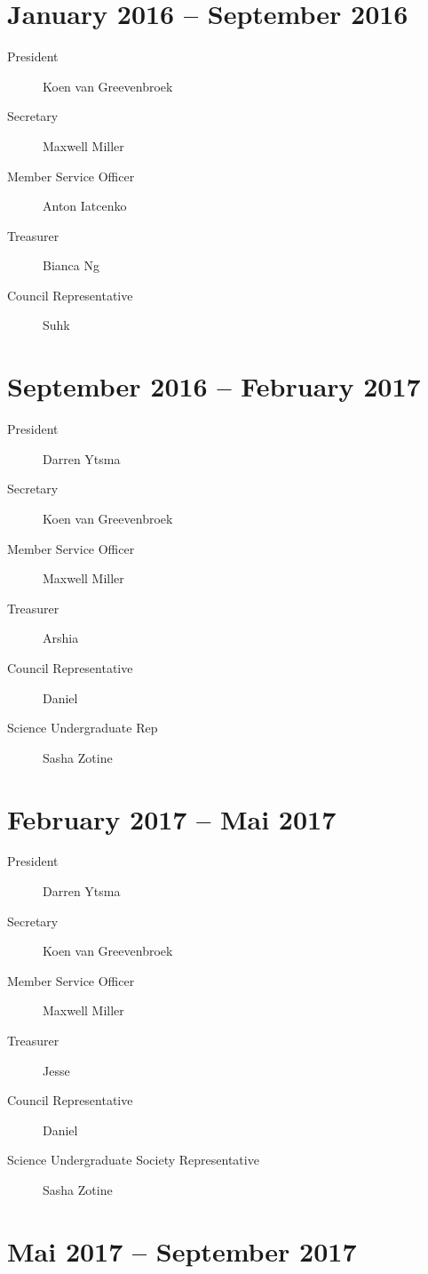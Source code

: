 \documentclass[12pt]{amsart}
\begin{document}
\section*{January 2016 -- September 2016}

\begin{description}
\item[President] Koen van Greevenbroek
\item[Secretary] Maxwell Miller
\item[Member Service Officer] Anton Iatcenko
\item[Treasurer] Bianca Ng
\item[Council Representative] Suhk
\end{description}


\section*{September 2016 -- February 2017}

\begin{description}
\item[President] Darren Ytsma
\item[Secretary] Koen van Greevenbroek
\item[Member Service Officer] Maxwell Miller
\item[Treasurer] Arshia
\item[Council Representative] Daniel
\item[Science Undergraduate Rep] Sasha Zotine
\end{description}


\section*{February 2017 -- Mai 2017}

\begin{description}
\item[President] Darren Ytsma
\item[Secretary] Koen van Greevenbroek
\item[Member Service Officer] Maxwell Miller
\item[Treasurer] Jesse
\item[Council Representative] Daniel
\item[Science Undergraduate Society Representative] Sasha Zotine
\end{description}


\section*{Mai 2017 -- September 2017}
\end{document}
